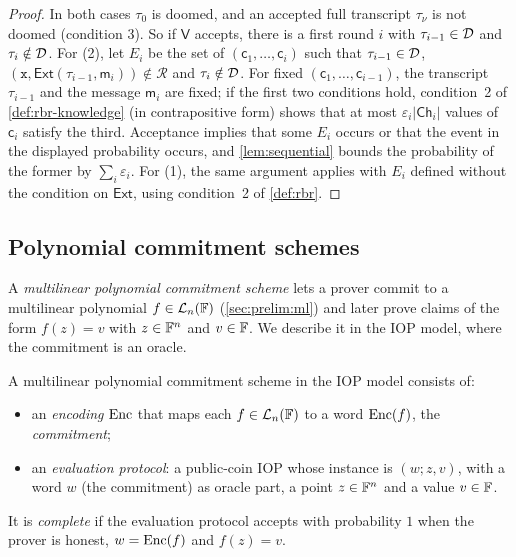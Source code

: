 \begin{proof}
In both cases $\tau_0$ is doomed, and an accepted full transcript $\tau_\nu$ is not doomed (condition 3).
So if $\mathsf{V}$ accepts, there is a first round $i$ with $\tau_{i-1} \in \mathcal{D}$ and $\tau_i \notin \mathcal{D}$.
For (2), let $E_i$ be the set of $(\mathsf{c}_1,\dots,\mathsf{c}_i)$ such that $\tau_{i-1} \in \mathcal{D}$, $(\mathtt{x}, \mathsf{Ext}(\tau_{i-1}, \mathsf{m}_i)) \notin \mathcal{R}$ and $\tau_i \notin \mathcal{D}$.
For fixed $(\mathsf{c}_1,\dots,\mathsf{c}_{i-1})$, the transcript $\tau_{i-1}$ and the message $\mathsf{m}_i$ are fixed; if the first two conditions hold, condition~2 of \cref{def:rbr-knowledge} (in contrapositive form) shows that at most $\varepsilon_i |\mathsf{Ch}_i|$ values of $\mathsf{c}_i$ satisfy the third.
Acceptance implies that some $E_i$ occurs or that the event in the displayed probability occurs, and \cref{lem:sequential} bounds the probability of the former by $\sum_i \varepsilon_i$.
For (1), the same argument applies with $E_i$ defined without the condition on $\mathsf{Ext}$, using condition~2 of \cref{def:rbr}.
\end{proof}

\subsection{Polynomial commitment schemes}\label{sec:proofs:pcs}

A \emph{multilinear polynomial commitment scheme} lets a prover commit to a multilinear polynomial $f \in \mathcal{L}_n(\mathbb{F})$ (\cref{sec:prelim:ml}) and later prove claims of the form $f(z) = v$ with $z \in \mathbb{F}^n$ and $v \in \mathbb{F}$.
We describe it in the IOP model, where the commitment is an oracle.

\begin{definition}\label{def:pcs}
A multilinear polynomial commitment scheme in the IOP model consists of:
\begin{itemize}
  \item an \emph{encoding} $\mathrm{Enc}$ that maps each $f \in \mathcal{L}_n(\mathbb{F})$ to a word $\mathrm{Enc}(f)$, the \emph{commitment};
  \item an \emph{evaluation protocol}: a public-coin IOP whose instance is $(w; z, v)$, with a word $w$ (the commitment) as oracle part, a point $z \in \mathbb{F}^n$ and a value $v \in \mathbb{F}$.
\end{itemize}
It is \emph{complete} if the evaluation protocol accepts with probability $1$ when the prover is honest, $w = \mathrm{Enc}(f)$ and $f(z) = v$.
\end{definition}

